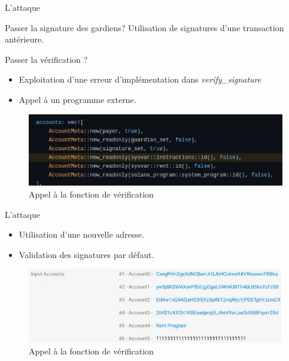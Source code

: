 \begin{frame}{L'attaque}
    \begin{block}{Passer la signature des gardiens?}
        Utilisation de signatures d'une transaction antérieure.
    \end{block}
    \pause
    \begin{block}{Passer la vérification ?}
        \begin{itemize}
            \item Exploitation d'une erreur d'implémentation dans \textit{verify\_signature}
            \item Appel à un programme externe.
        \end{itemize}
        \begin{figure}
            \centering
            \includegraphics[scale = 0.3]{centralisation/img/sysvar_atk.png}
            \caption{Appel à la fonction de vérification}
        \end{figure}
    \end{block}
\end{frame}

\begin{frame}{L'attaque}
    \begin{itemize}
        \item Utilisation d'une nouvelle adresse.
        \item Validation des signatures par défaut.
    \end{itemize}
    \begin{figure}
        \centering
        \includegraphics[scale = 0.3]{centralisation/img/sysvar_transaction.png}
        \caption{Appel à la fonction de vérification}
    \end{figure}
\end{frame}

